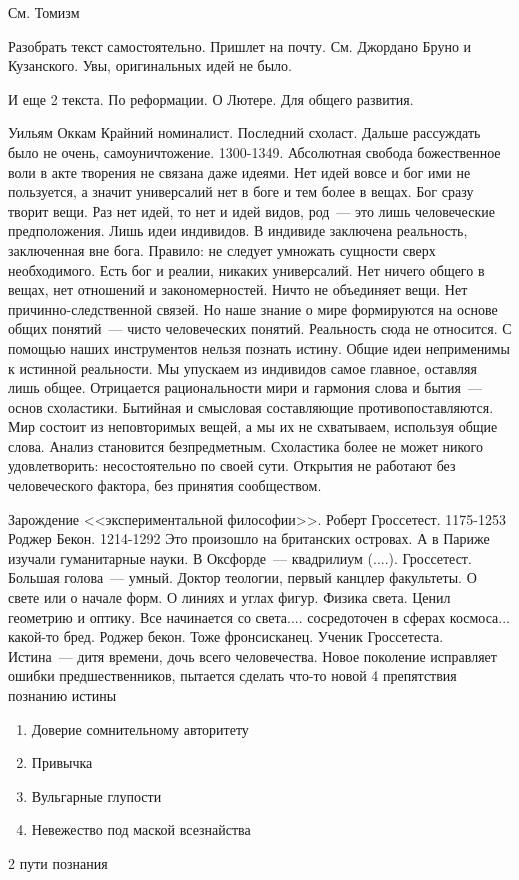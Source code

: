 См. Томизм

Разобрать текст самостоятельно. Пришлет на почту. См. Джордано Бруно и Кузанского. Увы, оригинальных идей не было.

И еще 2 текста. По реформации. О Лютере. Для общего развития.

Уильям Оккам
Крайний номиналист. Последний схоласт. Дальше рассуждать было не очень, самоуничтожение. 1300-1349.
Абсолютная свобода божественное воли в акте творения не связана даже идеями. Нет идей вовсе и бог ими не пользуется, а значит универсалий нет в боге и тем более в вещах. Бог сразу творит вещи. Раз нет идей, то нет и идей видов, род~--- это лишь человеческие предположения. Лишь идеи индивидов. В индивиде заключена реальность, заключенная вне бога. Правило: не следует умножать сущности сверх необходимого. Есть бог и реалии, никаких универсалий. Нет ничего общего в вещах, нет отношений и закономерностей. Ничто не объединяет вещи. Нет причинно-следственной связей. Но наше знание о мире формируются на основе общих понятий~--- чисто человеческих понятий. Реальность сюда не относится. С помощью наших инструментов нельзя познать истину. Общие идеи неприменимы к истинной реальности. Мы упускаем из индивидов самое главное, оставляя лишь общее. Отрицается рациональности мири и гармония слова и бытия~--- основ схоластики. Бытийная и смысловая составляющие противопоставляются. Мир состоит из неповторимых вещей, а мы их не схватываем, используя общие слова. Анализ становится безпредметным. Схоластика более не может никого удовлетворить: несостоятельно по своей сути.
Открытия не работают без человеческого фактора, без принятия сообществом.

Зарождение <<экспериментальной философии>>.
Роберт Гроссетест. 1175-1253
Роджер Бекон. 1214-1292
Это произошло на британских островах. А в Париже изучали гуманитарные науки. В Оксфорде~--- квадрилиум (....).
Гроссетест. Большая голова~--- умный. Доктор теологии, первый канцлер факультеты. О свете или о начале форм. О линиях и углах фигур. Физика света. Ценил геометрию и оптику. Все начинается со света.... сосредоточен в сферах космоса... какой-то бред.
Роджер бекон. Тоже фронсисканец. Ученик Гроссетеста. Истина~--- дитя времени, дочь всего человечества. Новое поколение исправляет ошибки предшественников, пытается сделать что-то новой
4 препятствия познанию истины

\begin{enumerate}
	\item Доверие сомнительному авторитету
	\item Привычка
	\item Вульгарные глупости
	\item Невежество под маской всезнайства
\end{enumerate}
2 пути познания

